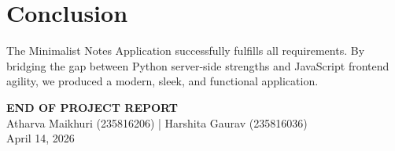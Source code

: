 \documentclass[11pt,a4paper]{article}
\begin{document}
\newpage
\section{Conclusion}
The Minimalist Notes Application successfully fulfills all requirements. By bridging the gap between Python server-side strengths and JavaScript frontend agility, we produced a modern, sleek, and functional application.

\begin{center}
    \vspace{2cm}
    \textbf{END OF PROJECT REPORT}\\
    Atharva Maikhuri (235816206) | Harshita Gaurav (235816036)\\
    April 14, 2026
\end{center}
\end{document}
